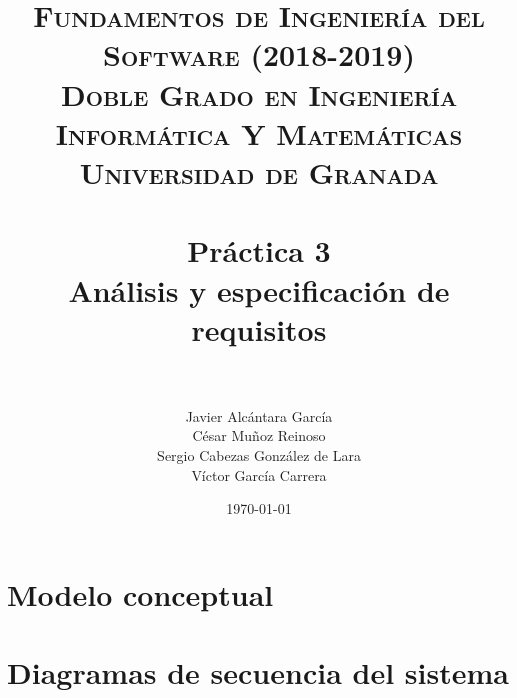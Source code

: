 


\graphicspath{{images/}}


\title{	
\normalfont \normalsize 
\textsc{\textbf{Fundamentos de Ingeniería del Software (2018-2019)} \\ Doble Grado en Ingeniería Informática Y Matemáticas \\ Universidad de Granada} \\ [25pt] %
\horrule{0.5pt} \\[0.4cm] %
\huge \textbf{Práctica 3} \\ Análisis y especificación de requisitos \\ %
\horrule{2pt} \\[0.5cm] %
}

\author{Javier Alcántara García\\ César Muñoz Reinoso \\ Sergio Cabezas González de Lara \\ Víctor García Carrera} %

\date{\normalsize\today} %





\maketitle %

\newpage %

\tableofcontents %

\newpage

\section{Modelo conceptual}

\newpage

\section{Diagramas de secuencia del sistema}
